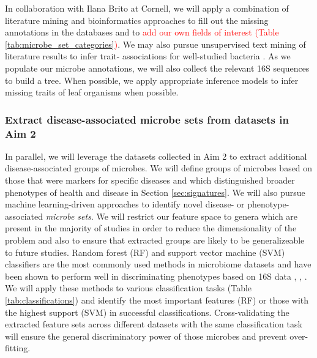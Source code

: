 \documentclass[12pt]{article}
\begin{document}
In collaboration with Ilana Brito at Cornell, we will apply a 
combination of literature mining and bioinformatics approaches to fill 
out the missing annotations in the databases and to \textcolor{red}{add our own fields 
of interest (Table \ref{tab:microbe_set_categories})}. We may also 
pursue unsupervised text mining of literature results to infer trait-
associations for well-studied bacteria \cite{korbel-lit_mining-2005}. As we populate 
our microbe annotations, we will also collect the relevant 16S sequences to 
build a tree. When possible, we apply appropriate inference models to infer 
missing traits of leaf organisms when possible.

\subsubsection{Extract disease-associated microbe sets from datasets in Aim 2}
In parallel, we will leverage the datasets collected in Aim 2 to extract additional 
disease-associated groups of microbes. We will define groups of 
microbes based on those that were markers for specific diseases and which
distinguished broader phenotypes of health and disease in Section \ref{sec:signatures}. 
We will also pursue machine learning-driven approaches to identify novel disease- or 
phenotype-associated \textit{microbe sets}. We will restrict our feature space
to genera which are present in the majority of studies in order to reduce the
dimensionality of the problem and also to ensure that extracted groups
are likely to be generalizeable to future studies. Random forest (RF) and support
vector machine (SVM) classifiers are the most commonly used methods in
microbiome datasets and have been shown to perform well in discriminating
phenotypes based on 16S data \cite{pasolli-meta_analysis-2016}, \cite{ibd-papa}, \cite{knights-supervised-2010}. We will apply these methods to various classification tasks (Table \ref{tab:classifications})
and identify the most important features (RF) or those with the highest support (SVM)
in successful classifications.
Cross-validating the extracted feature sets across different datasets with the same
classification task will ensure the general discriminatory 
power of those microbes and prevent over-fitting.
\end{document}
